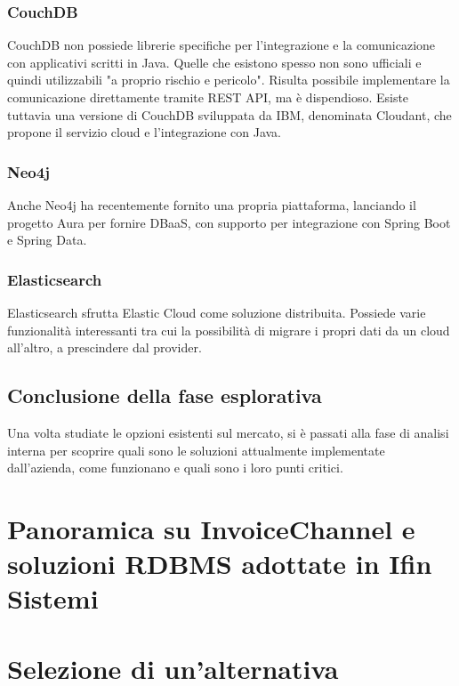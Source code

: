 \subsubsection{CouchDB}
CouchDB non possiede librerie specifiche per l'integrazione e la comunicazione con applicativi scritti in Java. Quelle che esistono spesso non sono ufficiali e quindi utilizzabili "a proprio rischio e pericolo". Risulta possibile implementare la comunicazione direttamente tramite REST API, ma è dispendioso.
Esiste tuttavia una versione di CouchDB sviluppata da IBM, denominata Cloudant, che propone il servizio cloud e l'integrazione con Java.

\subsubsection{Neo4j}
Anche Neo4j ha recentemente fornito una propria piattaforma, lanciando il progetto Aura per fornire DBaaS, con supporto per integrazione con Spring Boot e Spring Data.

\subsubsection{Elasticsearch}
Elasticsearch sfrutta Elastic Cloud come soluzione distribuita.
Possiede varie funzionalità interessanti tra cui la possibilità di migrare i propri dati da un cloud all'altro, a prescindere dal provider.

\subsection{Conclusione della fase esplorativa}
Una volta studiate le opzioni esistenti sul mercato, si è passati alla fase di analisi interna per scoprire quali sono le soluzioni attualmente implementate dall'azienda, come funzionano e quali sono i loro punti critici.

\section{Panoramica su InvoiceChannel e soluzioni RDBMS adottate in Ifin Sistemi}


\section{Selezione di un'alternativa}

